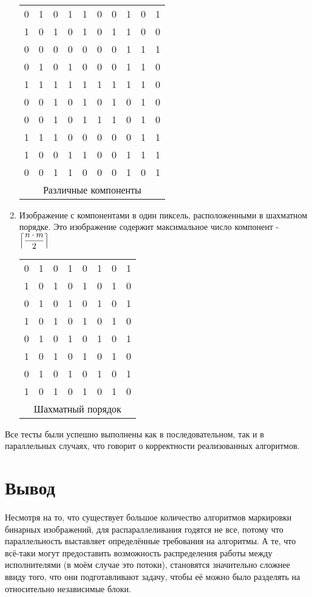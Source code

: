 \documentclass[14pt]{extarticle}
\begin{document}
\begin{enumerate}
    \\\begin{center}\begin{tabular}{ |cccccccccc | }
    \hline
     0 & 1 & 0 & 1 & 1 & 0&0&1&0&1\\  
     1 & 0 & 1 & 0 & 1&0&1&1&0&0\\ 
     0&0&0&0&0&0&0&1&1&1\\
     0&1&0&1&0&0&0&1&1&0\\
     1&1&1&1&1&1&1&1&1&0\\
     0&0&1&0&1&0&1&0&1&0\\
     0&0&1&0&1&1&1&0&1&0\\
     1&1&1&0&0&0&0&0&1&1\\
     1&0&0&1&1&0&0&1&1&1\\
     0&0&1&1&0&0&0&1&0&1\\
     \hline
     \multicolumn{10}{c}{Различные компоненты}
    \end{tabular}
    \end{center}
    \item Изображение с компонентами в один пиксель, расположенными в шахматном порядке. Это изображение содержит максимальное число компонент - \(\Bigl \lceil \displaystyle\frac{n\cdot m}{2}\Bigr \rceil\)
    \\\begin{center}\begin{tabular}{ |cccccccc| }
    \hline
     0&1&0&1&0&1&0&1\\
     1&0&1&0&1&0&1&0\\
     0&1&0&1&0&1&0&1\\
     1&0&1&0&1&0&1&0\\
     0&1&0&1&0&1&0&1\\
     1&0&1&0&1&0&1&0\\
     0&1&0&1&0&1&0&1\\
     1&0&1&0&1&0&1&0\\
     \hline
     \multicolumn{8}{c}{Шахматный порядок}
    \end{tabular}
    \end{center}
\end{enumerate}
\par Все тесты были успешно выполнены как в последовательном, так и в параллельных случаях, что говорит о корректности реализованных алгоритмов.
\newpage
\section{Вывод}
\paragraph{} Несмотря на то, что существует большое количество алгоритмов маркировки бинарных изображений, для распараллеливания годятся не все, потому что параллельность выставляет определённые требования на алгоритмы. А те, что всё-таки могут предоставить возможность распределения работы между исполнителями (в моём случае это потоки), становятся значительно сложнее ввиду того, что они подготавливают задачу, чтобы её можно было разделять на относительно независимые блоки.
\newpage
\end{document}
